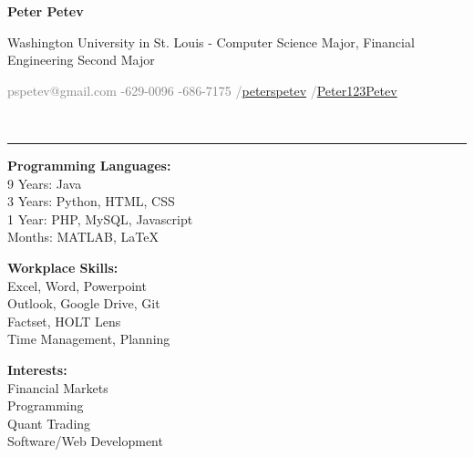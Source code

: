 \documentclass[12pt]{article}
\begin{document}
	\begin{titlepage}
		\small
			\begin{center}
				\centerline{{\Large \textbf{Peter Petev}}}
				\centerline{Washington University in St. Louis - Computer Science Major, Financial Engineering Second Major}
				\small
				\begin{minipage}[b]{\textwidth}
					\textcolor{gray}{\faEnvelope \space pspetev@gmail.com}\hfill
					\textcolor{gray}{\faMobilePhone {}-629-0096}\hfill
					\textcolor{gray}{\faPhoneSquare {}-686-7175}\hfill
					\textcolor{gray}{\faLinkedinSquare \slash \href{http://www.linkedin.com/in/peterspetev}{peterspetev}}\hfill
					\textcolor{gray}{\faGithubSquare \slash \href{http://www.github.com/Peter123Petev}{Peter123Petev}}
				\end{minipage}
			\end{center}
		\vspace{-15pt}
		\noindent\makebox[\linewidth]{\rule{\paperwidth}{0.4pt}}\vspace{5pt}
		\\\rule{\textwidth}{0.4pt}
		\begin{addmargin}[1em]{0em}
			\vspace{-10pt}
			\begin{center}
				\begin{minipage}[b]{0.4\textwidth}
					\textbf{Programming Languages:}\\ 9 Years: Java\\ 3 Years: Python, HTML, CSS\\ 1 Year: PHP, MySQL, Javascript\\Months: MATLAB, \LaTeX\\
				\end{minipage}%
				\begin{minipage}[b]{0.3\textwidth}
					\textbf{Workplace Skills:}\\ Excel, Word, Powerpoint\\ Outlook, Google Drive, Git\\ Factset, HOLT Lens\\Time Management, Planning\\
				\end{minipage}%
				\begin{minipage}[b]{0.3\textwidth}
					\textbf{Interests:}\\ Financial Markets\\ Programming\\ Quant Trading\\ Software/Web Development\\

\end{minipage}
\end{center}
\end{addmargin}
\end{titlepage}
\end{document}

